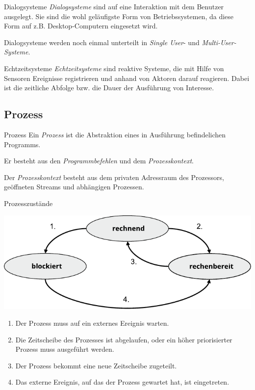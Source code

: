 \documentclass[german]{spicker}
\begin{document}
\begin{bonus}{Dialogsysteme}
    \emph{Dialogsysteme} sind auf eine Interaktion mit dem Benutzer ausgelegt.
    Sie sind die wohl geläufigste Form von Betriebssystemen, da diese Form auf z.B. Desktop-Computern eingesetzt wird.

    Dialogsysteme werden noch einmal unterteilt in \emph{Single User}- und \emph{Multi-User-Systeme}.
\end{bonus}

\begin{bonus}{Echtzeitsysteme}
    \emph{Echtzeitsysteme} sind reaktive Systeme, die mit Hilfe von Sensoren Ereignisse registrieren und anhand von Aktoren darauf reagieren.
    Dabei ist die zeitliche Abfolge bzw. die Dauer der Ausführung von Interesse.
\end{bonus}

\subsection{Prozess}

\begin{defi}{Prozess}
    Ein \emph{Prozess} ist die Abstraktion eines in Ausführung befindelichen Programms.

    Er besteht aus den \emph{Programmbefehlen} und dem \emph{Prozesskontext}.

    Der \emph{Prozesskontext} besteht aus dem privaten Adressraum des Prozessors, geöffneten Streams und abhängigen Prozessen.
\end{defi}

\begin{defi}{Prozesszustände}
    \begin{center}
        \includegraphics[]{images/prozesszustaende.pdf}
    \end{center}
    \begin{enumerate}
        \item Der Prozess muss auf ein externes Ereignis warten.
        \item Die Zeitscheibe des Prozesses ist abgelaufen, oder ein höher priorisierter Prozess muss ausgeführt werden.
        \item Der Prozess bekommt eine neue Zeitscheibe zugeteilt.
        \item Das externe Ereignis, auf das der Prozess gewartet hat, ist eingetreten.
    \end{enumerate}
\end{defi}
\end{document}
